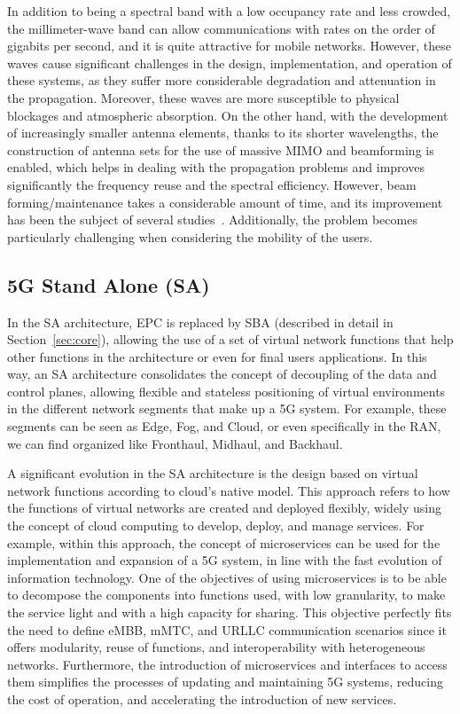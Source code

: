 In addition to being a spectral band with a low occupancy rate and less crowded, the millimeter-wave band can allow communications with rates on the order of gigabits per second, and it is quite attractive for mobile networks. However, these waves cause significant challenges in the design, implementation, and operation of these systems, as they suffer more considerable degradation and attenuation in the propagation. Moreover, these waves are more susceptible to physical blockages and atmospheric absorption. On the other hand, with the development of increasingly smaller antenna elements, thanks to its shorter wavelengths, the construction of antenna sets for the use of massive MIMO and beamforming is enabled, which helps in dealing with the propagation problems and improves significantly the frequency reuse and the spectral efficiency. However, beam forming/maintenance takes a considerable amount of time, and its improvement has been the subject of several studies~\cite{giordani:19, zhang:19}. Additionally, the problem becomes particularly challenging when considering the mobility of the users.


\subsection{5G Stand Alone (SA)}\label{sec:SA}

In the SA architecture, EPC is replaced by SBA (described in detail in Section~\ref{sec:core}), allowing the use of a set of virtual network functions that help other functions in the architecture or even for final users applications. In this way, an SA architecture consolidates the concept of decoupling of the data and control planes, allowing flexible and stateless positioning of virtual environments in the different network segments that make up a 5G system. For example, these segments can be seen as Edge, Fog, and Cloud, or even specifically in the RAN, we can find organized like Fronthaul, Midhaul, and Backhaul.

A significant evolution in the SA architecture is the design based on virtual network functions according to cloud's native model. This approach refers to how the functions of virtual networks are created and deployed flexibly, widely using the concept of cloud computing to develop, deploy, and manage services. For example, within this approach, the concept of microservices can be used for the implementation and expansion of a 5G system, in line with the fast evolution of information technology. One of the objectives of using microservices is to be able to decompose the components into functions used, with low granularity, to make the service light and with a high capacity for sharing. This objective perfectly fits the need to define eMBB, mMTC, and URLLC communication scenarios since it offers modularity, reuse of functions, and interoperability with heterogeneous networks. Furthermore, the introduction of microservices and interfaces to access them simplifies the processes of updating and maintaining 5G systems, reducing the cost of operation, and accelerating the introduction of new services.

